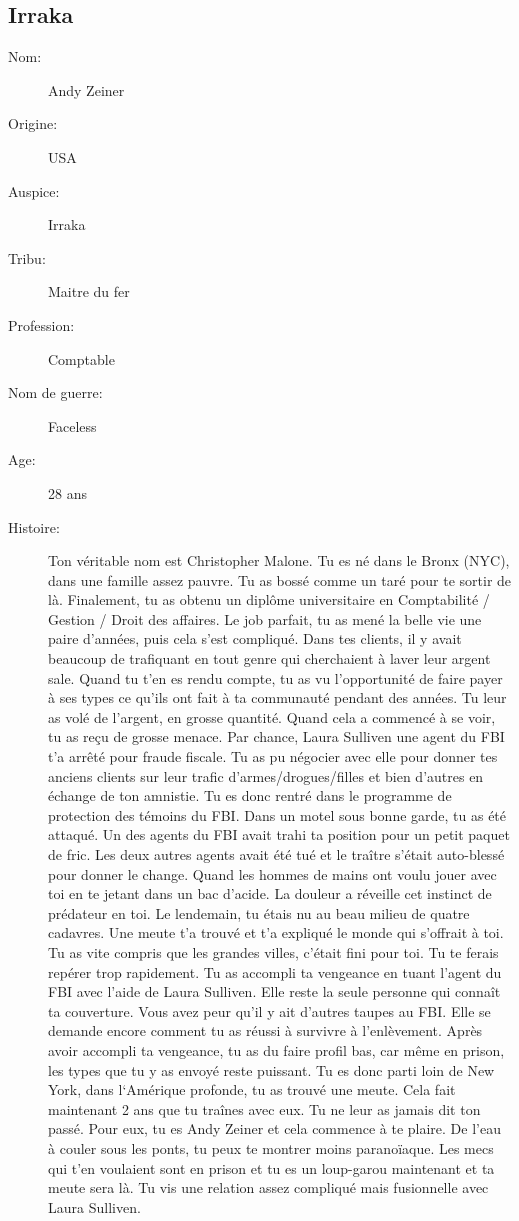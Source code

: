 \documentclass[oneside,12pt]{book}
\begin{document}
\begin{flushleft}
\clearpage
\section{Irraka}
\begin{description}
\item[Nom:]{Andy Zeiner}
\item[Origine:]{USA}
\item[Auspice:]{Irraka}
\item[Tribu:]{Maitre du fer}
\item[Profession:]{Comptable}
\item[Nom de guerre:]{Faceless}
\item[Age:]{28 ans}
\item[Histoire:]{
Ton véritable nom est Christopher Malone. Tu es né dans le Bronx (NYC), dans une famille assez pauvre. Tu as bossé comme un taré pour te sortir de là. Finalement, tu as obtenu un diplôme universitaire en
Comptabilité / Gestion / Droit des affaires. Le job parfait, tu as mené la belle vie une paire d'années, puis cela s'est compliqué. Dans tes clients, il y avait beaucoup de trafiquant en tout genre qui
cherchaient à laver leur argent sale.
Quand tu t'en es rendu compte, tu as vu l'opportunité de faire payer à ses types ce qu'ils ont fait à ta communauté pendant des années. Tu leur as volé de l'argent, en grosse quantité.
Quand cela a commencé à se voir, tu as reçu de grosse menace. Par chance, Laura Sulliven une agent du FBI t'a arrêté pour fraude fiscale. Tu as pu négocier avec elle pour donner tes anciens clients sur
leur trafic d'armes/drogues/filles et bien d'autres en échange de ton amnistie.
Tu es donc rentré dans le programme de protection des témoins du FBI. Dans un motel sous bonne garde, tu as été attaqué. Un des agents du FBI avait trahi ta position pour un petit paquet de
fric.
Les deux autres agents avait été tué et le traître s'était auto-blessé pour donner le change. Quand les hommes de mains ont voulu jouer avec toi en te jetant dans un bac d'acide. La douleur a réveille cet
instinct de prédateur en toi. Le lendemain, tu étais nu au beau milieu de quatre cadavres. Une meute t'a trouvé et t'a expliqué le monde qui s'offrait à toi.
Tu as vite compris que les grandes villes, c'était fini pour toi. Tu te ferais repérer trop rapidement. Tu as accompli ta vengeance en tuant l'agent du FBI avec l'aide de Laura Sulliven. Elle reste la seule
personne qui connaît ta couverture. Vous avez peur qu'il y ait d'autres taupes au FBI. Elle se demande encore comment tu as réussi à survivre à l'enlèvement.
Après avoir accompli ta vengeance, tu as du faire profil bas, car même en prison, les types que tu y as envoyé reste puissant. Tu es donc parti loin de New York, dans l`Amérique profonde, tu as trouvé une
meute. Cela fait maintenant 2 ans que tu traînes avec eux. Tu ne leur as jamais dit ton passé. Pour eux, tu es Andy Zeiner et cela commence à te plaire. De l'eau à couler sous les ponts, tu peux te montrer moins paranoïaque. Les mecs qui t'en voulaient sont en prison et tu es un loup-garou maintenant et ta meute sera là.
Tu vis une relation assez compliqué mais fusionnelle avec Laura Sulliven. 


}
\end{description}
\end{flushleft}
\end{document}
